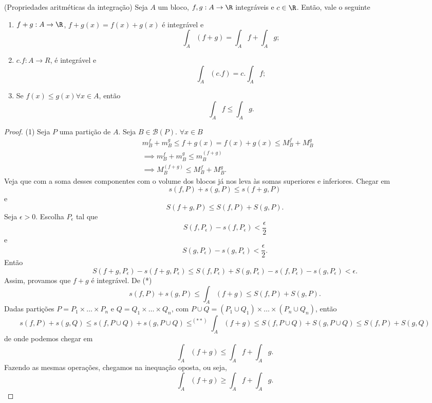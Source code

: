 \begin{theorem}
    (Propriedades aritméticas da integração) Seja $A$ um bloco, $f, g: A\to \R$ integráveis e $c\in \R$. Então, vale o seguinte
    \begin{enumerate}
	\item $f+g:A\to \R$, $f+g(x) = f(x) + g(x)$ é integrável e \[
	\int_A \left( f+g \right) = \int_A f + \int_A g
	;\] 
	\item $c.f: A \to R$, é integrável e  \[
	\int_A \left( c.f \right) = c. \int_A f
	;\] 
	\item Se $f(x) \le g(x) \forall x \in A$, então \[
	\int_A f \le \int_A g
	.\] 
    \end{enumerate}
\end{theorem}
\begin{proof}
    (1) Seja $P$ uma partição de $A$. Seja $B\in \mathcal{B}\left( P \right) $. $\forall  x\in B$
    \begin{align*}
	& m_B^{f} + m_B^{g} \le  f+g \left( x \right) =f(x) + g(x) \le M_B^{f} + M_B^{g}\\
	&\implies m_B^{f} + m_B^{g} \le m_B^{(f+g)} \\
	&\implies M_B^{(f+g)}\le M_B^{f} + M_B^{g}
    .\end{align*}
    Veja que com a soma desses componentes com o volume dos blocos já nos leva às somas superiores e inferiores. Chegar em \[
    s\left( f,P \right) +s\left( g,P \right) \le s\left( f+g, P \right) 
    \] e \[
    S\left( f+g,P \right) \le S\left( f,P \right) +S\left( g,P \right) 
    .\] Seja $\epsilon>0$. Escolha $P_\epsilon$ tal que \[
    S\left( f,P_\epsilon \right) - s\left( f,P_\epsilon \right) < \frac{\epsilon}{2} \tag{*}
    \] e \[
    S\left( g,P_\epsilon \right) -s\left( g,P_\epsilon \right) <\frac{\epsilon}{2}
    .\] Então \[
    S\left( f+g, P_\epsilon \right) - s\left( f+g, P_\epsilon \right)  \le S\left( f,P_\epsilon \right) +S\left( g,P_\epsilon \right) - s\left( f,P_\epsilon \right) -s\left( g, P_\epsilon \right) < \epsilon
    .\] Assim, provamos que $f+g$ é integrável.
    De (*) \[
    s\left( f,P \right) + s\left( g,P \right)  \le \int_A \left( f+g \right) \le S\left( f,P \right) + S\left( g,P \right) \tag{**}
    .\] Dadas partições $P=P_1\times \ldots\times P_n$ e $Q=Q_1\times \ldots\times Q_n$, com $P\cup Q = \left( P_1\cup Q_1 \right) \times \ldots\times \left( P_n\cup Q_n \right) $, então \[
    s\left( f,P \right) +s\left( g,Q \right) \le s\left( f, P\cup Q \right) + s\left( g, P\cup Q \right) \le^{(**)} \int_A\left( f+g \right) \le  S\left( f,P\cup Q \right) + S\left( g,P\cup Q \right) \le S\left( f,P \right) +S\left( g,Q \right) 
    \] de onde podemos chegar em \[
    \int_A \left( f+g \right) \le \int_A f + \int_A g
    .\] Fazendo as mesmas operações, chegamos na inequação oposta, ou seja, \[
    \int_A \left( f+g \right) \ge  \int_A f + \int_A g
    .\] 


\end{proof}
